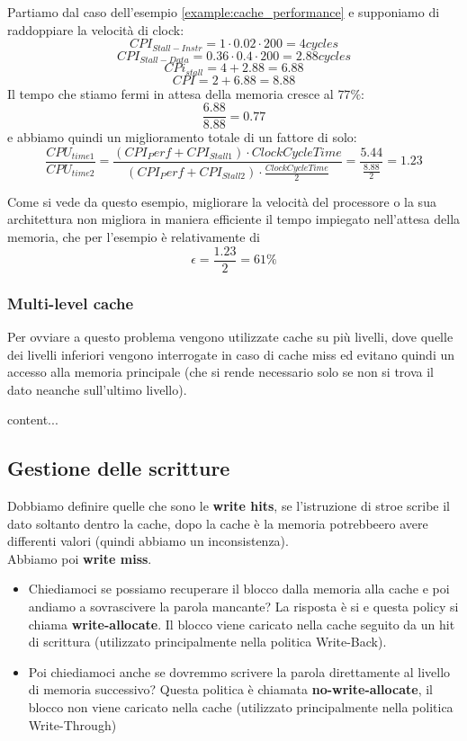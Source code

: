 \begin{example}
	Partiamo dal caso dell'esempio \ref{example:cache_performance} e supponiamo di raddoppiare la velocità di clock:
	\[CPI_{Stall-Instr} = 1 \cdot 0.02 \cdot 200 = 4 cycles\]
	\[CPI_{Stall-Data} = 0.36 \cdot 0.4 \cdot 200 = 2.88 cycles\]
	\[CPi_{stall} = 4 + 2.88 = 6.88\]
	\[CPI = 2+6.88 = 8.88\]
	Il tempo che stiamo fermi in attesa della memoria cresce al $77\%$:
	\begin{equation*}
		\frac{6.88}{8.88}=0.77
	\end{equation*}
	e abbiamo quindi un miglioramento totale di un fattore di solo:
	\begin{equation*}
		\frac{CPU_{time1}}{CPU_{time2}} = \frac{(CPI_Perf + CPI_{Stall1}) \cdot ClockCycleTime}{(CPI_Perf + CPI_{Stall2}) \cdot \frac{ClockCycleTime}{2}} = \frac{5.44}{\frac{8.88}{2}} = 1.23
	\end{equation*}
\end{example}
Come si vede da questo esempio, migliorare la velocità del processore o la sua architettura non migliora in maniera efficiente il tempo impiegato nell'attesa della memoria, che per l'esempio è relativamente di
\begin{equation*}
	\epsilon = \frac{1.23}{2}=61\%
\end{equation*}
\subsubsection{Multi-level cache}
Per ovviare a questo problema vengono utilizzate cache su più livelli, dove quelle dei livelli inferiori vengono interrogate in caso di cache miss ed evitano quindi un accesso alla memoria principale (che si rende necessario solo se non si trova il dato neanche sull'ultimo livello).
\begin{example}
	content...
\end{example}


\subsection{Gestione delle scritture}
Dobbiamo definire quelle che sono le \textbf{write hits}, se l'istruzione di stroe scribe il dato soltanto dentro la cache, dopo la cache
è la memoria potrebbeero avere differenti valori (quindi abbiamo un inconsistenza).\\
Abbiamo poi \textbf{write miss}. 
\begin{itemize}
	\item Chiediamoci se possiamo recuperare il blocco dalla memoria alla cache e poi andiamo a sovrascivere la parola mancante?
	La risposta è si e questa policy si chiama \textbf{write-allocate}.
	Il blocco viene caricato nella cache seguito da un hit di scrittura (utilizzato principalmente nella politica Write-Back).
	\item Poi chiediamoci anche se dovremmo scrivere la parola direttamente al livello di memoria successivo? 
	Questa politica è chiamata \textbf{no-write-allocate}, il blocco non viene caricato nella cache (utilizzato principalmente nella politica Write-Through)
\end{itemize}

